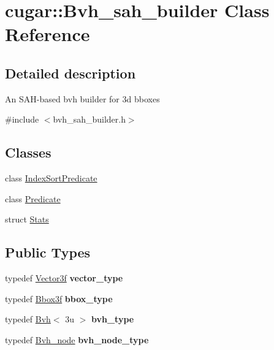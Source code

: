 \hypertarget{classcugar_1_1_bvh__sah__builder}{}\section{cugar\+:\+:Bvh\+\_\+sah\+\_\+builder Class Reference}
\label{classcugar_1_1_bvh__sah__builder}


\subsection{Detailed description}
An S\+A\+H-\/based bvh builder for 3d bboxes 

{\ttfamily \#include $<$bvh\+\_\+sah\+\_\+builder.\+h$>$}

\subsection*{Classes}
\begin{DoxyCompactItemize}
\item 
class \hyperlink{classcugar_1_1_bvh__sah__builder_1_1_index_sort_predicate}{Index\+Sort\+Predicate}
\item 
class \hyperlink{classcugar_1_1_bvh__sah__builder_1_1_predicate}{Predicate}
\item 
struct \hyperlink{structcugar_1_1_bvh__sah__builder_1_1_stats}{Stats}
\end{DoxyCompactItemize}
\subsection*{Public Types}
\begin{DoxyCompactItemize}
\item 
\mbox{\label{classcugar_1_1_bvh__sah__builder_a106375bb58b503da322d0ee5c3cbe9cc}} 
typedef \hyperlink{structcugar_1_1_vector}{Vector3f} {\bfseries vector\+\_\+type}
\item 
\mbox{\label{classcugar_1_1_bvh__sah__builder_a8ce26c3257e7164ab775873a99b5595d}} 
typedef \hyperlink{structcugar_1_1_bbox}{Bbox3f} {\bfseries bbox\+\_\+type}
\item 
\mbox{\label{classcugar_1_1_bvh__sah__builder_a7e9f359d67fc61239208506992ee5d13}} 
typedef \hyperlink{structcugar_1_1_bvh}{Bvh}$<$ 3u $>$ {\bfseries bvh\+\_\+type}
\item 
\mbox{\label{classcugar_1_1_bvh__sah__builder_af9820a9d0d14c983ed10447b9f1fa456}} 
typedef \hyperlink{structcugar_1_1_bvh__node}{Bvh\+\_\+node} {\bfseries bvh\+\_\+node\+\_\+type}
\end{DoxyCompactItemize}

